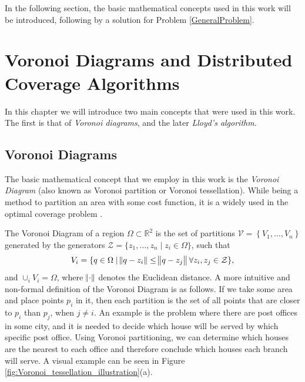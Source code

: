 \documentclass{iacas}
\newcommand{\rsqr}{\mathbb{R}^2}
\begin{document}
In the following section, the basic mathematical concepts used in this work will be introduced, following by a solution for Problem \ref{GeneralProblem}. %

\section{Voronoi Diagrams and Distributed Coverage Algorithms}
In this chapter we will introduce two main concepts that were used in this work. The first is that of \emph{Voronoi diagrams}, and the later \emph{Lloyd's algorithm}.
\subsection{Voronoi Diagrams}
The basic mathematical concept that we employ in this work is the \emph{Voronoi Diagram} (also known as Voronoi partition or Voronoi tessellation). While being a method to partition an area with some cost function, it is a widely used in the optimal coverage problem \cite{Cortes2004,Hussein2007, Du1999}. 
%

The Voronoi Diagram of a region $\Omega \subset \rsqr$ is the set of partitions $\mathcal{V} = \left\{V_{1}, \ldots, V_n\right\}$ %
generated by the generators $\mathcal{Z} = \{z_1,\ldots,z_n\mid z_{i} \in \Omega\}$, such that
\begin{equation} \label{Voronoi Definition}
V_{i} = \{q\in\Omega \mid \norm{q - z_i} \leq \norm{q - z_j} \forall z_i,z_j\in\mathcal{Z}\},
\end{equation}
and $\cup_i V_i = \Omega$, where %
$\norm{\cdot}$ denotes the Euclidean distance.
%
A more intuitive and non-formal definition of the Voronoi Diagram is as follows. If we take some area and place points $p_i$ in it, then each partition is the set of all points that are closer to $p_i$ than $p_j$, when $j \neq i$. An example is the problem where there are post offices in some city, and it is needed to decide which house will be served by which specific post office. Using Voronoi partitioning, we can determine which houses are the nearest to each office and therefore conclude which houses each branch will serve. A visual example can be seen in Figure \ref{fig:Voronoi_tessellation_illustration}(a).
\end{document}
